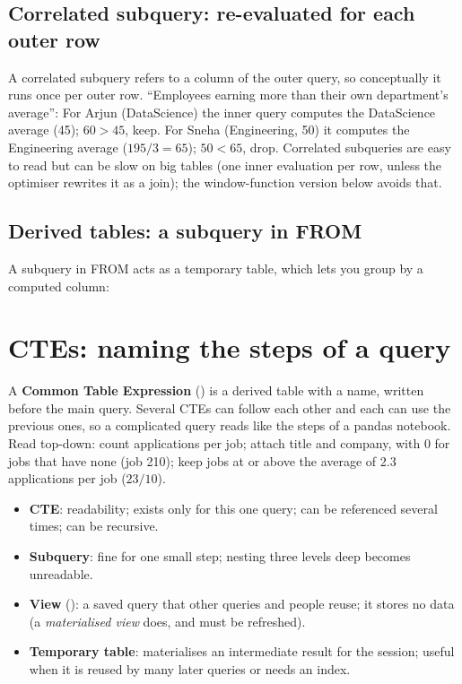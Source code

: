 \subsection{Correlated subquery: re-evaluated for each outer row}
A correlated subquery refers to a column of the outer query, so conceptually it runs once per outer row. ``Employees earning more than their own
department's average'':
For Arjun (DataScience) the inner query computes the DataScience average (45); $60 > 45$, keep. For Sneha (Engineering, 50) it computes the Engineering
average ($195/3 = 65$); $50 < 65$, drop. Correlated subqueries are easy to read but can be slow on big tables (one inner evaluation per row, unless the
optimiser rewrites it as a join); the window-function version below avoids that.

\subsection{Derived tables: a subquery in FROM}
A subquery in FROM acts as a temporary table, which lets you group by a computed column:

\section{CTEs: naming the steps of a query}
A \textbf{Common Table Expression} () is a derived table with a name, written before the main query. Several CTEs can follow each
other and each can use the previous ones, so a complicated query reads like the steps of a pandas notebook.
Read top-down: count applications per job; attach title and company, with 0 for jobs that have none (job 210); keep jobs at or above the average of 2.3
applications per job ($23/10$).

\begin{intuition}
\begin{itemize}
\item \textbf{CTE}: readability; exists only for this one query; can be referenced several times; can be recursive.
\item \textbf{Subquery}: fine for one small step; nesting three levels deep becomes unreadable.
\item \textbf{View} (): a saved query that other queries and people reuse; it stores no data (a \emph{materialised view} does, and
must be refreshed).
\item \textbf{Temporary table}: materialises an intermediate result for the session; useful when it is reused by many later queries or needs an index.
\end{itemize}
\end{intuition}

